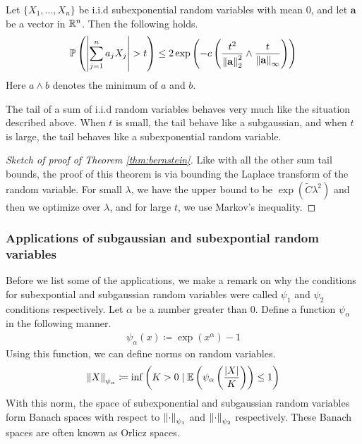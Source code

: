 \documentclass[11pt]{article}
\begin{document}
\begin{theorem}
  \label{thm:bernstein}
  Let $\{X_1, \ldots, X_n\}$ be i.i.d subexponential random variables with mean $0$, and let $\mathbf{a}$ be a vector in $\mathbb{R}^n$. Then the following holds.
  \begin{align*}
    \mathbb{P}\left( \left| \sum_{j=1}^n a_j X_j \right| > t \right) \leq
    2 \exp\left( -c \left( \frac{t^2}{\left\lVert\mathbf{a}\right\rVert_2^2} \wedge  \frac{t}{\left\lVert\mathbf{a}\right\rVert_\infty}\right) \right)
  \end{align*}
  Here $a \wedge b$ denotes the minimum of $a$ and $b$.
\end{theorem}
\begin{remark}
  The tail of a sum of i.i.d random variables behaves very much like the situation described above.
  When $t$ is small, the tail behave like a subgaussian, and when $t$ is large, the tail behaves like a subexponential random variable.
\end{remark}

\begin{proof}[Sketch of proof of Theorem \ref{thm:bernstein}]
  Like with all the other sum tail bounds, the proof of this theorem is via bounding the Laplace transform of the random variable.
  For small $\lambda$, we have the upper bound to be $\exp(\widetilde{C}\lambda^2)$ and then we optimize over $\lambda$, and for large $t$, we use Markov's inequality.
\end{proof}

\subsubsection{Applications of subgaussian and subexpontial random variables}
\label{sec:appl-subg-subexp}

Before we list some of the applications, we make a remark on why the conditions for subexpontial and subgaussian random variables were called $\psi_1$ and $\psi_2$ conditions respectively.
Let $\alpha$ be a number greater than $0$.
Define a function $\psi_{\alpha}$ in the following manner.
\begin{align*}
  \psi_{\alpha}(x) \coloneqq \exp(x^\alpha) - 1
\end{align*}
Using this function, we can define norms on random variables.
\begin{align*}
  \left\lVert X\right\rVert_{\psi_{\alpha}} \coloneqq \inf \left( K > 0 \mid \mathbb{E}\left( \psi_{\alpha} \left( \frac{|X|}{K} \right) \right) \leq 1 \right)
\end{align*}
With this norm, the space of subexponential and subgaussian random variables form Banach spaces with respect to $\left\lVert\cdot\right\rVert_{\psi_1}$ and $\left\lVert\cdot\right\rVert_{\psi_2}$ respectively. These Banach spaces are often known as Orlicz spaces.
\end{document}
